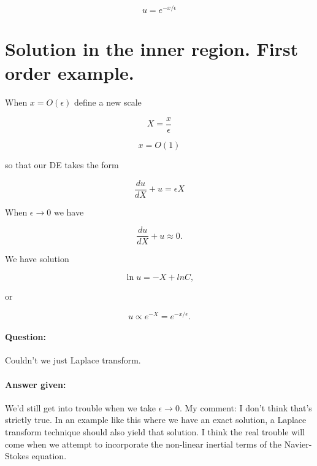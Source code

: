 \begin{equation}\label{eqn:continuumL20:170}
u = e^{-x/\epsilon}
\end{equation}

\section{Solution in the inner region.  First order example.}

When $x = O(\epsilon)$ define a new scale

\begin{equation}\label{eqn:continuumL20:190}
X = \frac{x}{\epsilon}
\end{equation}

\begin{equation}\label{eqn:continuumL20:210}
x = O(1)
\end{equation}

so that our DE takes the form

\begin{equation}\label{eqn:continuumL20:230}
\frac{du}{dX} + u = \epsilon X
\end{equation}

When $\epsilon \rightarrow 0$ we have

\begin{equation}\label{eqn:continuumL20:250}
\frac{du}{dX} + u \approx 0.
\end{equation}

We have solution

\begin{equation}\label{eqn:continuumL20:270}
\ln u = -X + ln C,
\end{equation}

or

\begin{equation}\label{eqn:continuumL20:290}
u \propto e^{-X} = e^{-x/\epsilon}.
\end{equation}

\paragraph{Question:} Couldn't we just Laplace transform.
\paragraph{Answer given:} We'd still get into trouble when we take $\epsilon \rightarrow 0$.  My comment: I don't think that's strictly true.  In an example like this where we have an exact solution, a Laplace transform technique should also yield that solution.  I think the real trouble will come when we attempt to incorporate the non-linear inertial terms of the Navier-Stokes equation.

